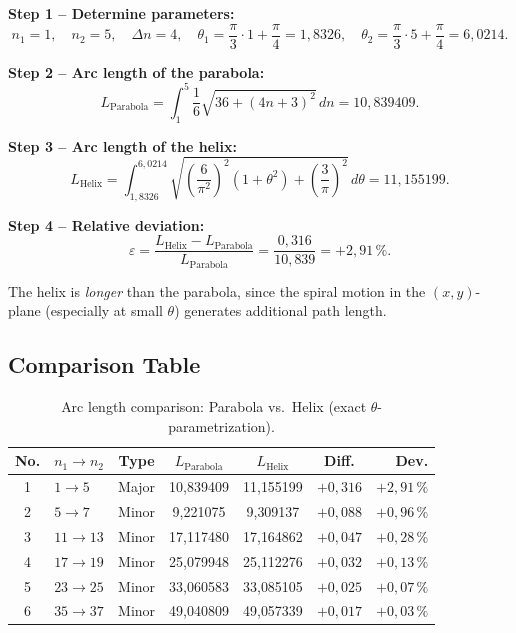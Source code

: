 \textbf{Step 1 -- Determine parameters:}
\[
n_1 = 1,\quad n_2 = 5,\quad \Delta n = 4,\quad
\theta_1 = \frac{\pi}{3}\cdot 1 + \frac{\pi}{4} = 1{,}8326,\quad
\theta_2 = \frac{\pi}{3}\cdot 5 + \frac{\pi}{4} = 6{,}0214.
\]

\textbf{Step 2 -- Arc length of the parabola:}
\[
L_{\text{Parabola}}
= \int_{1}^{5} \frac{1}{6}\sqrt{36 + (4n+3)^2}\, dn
= \boxed{10{,}839409}.
\]

\textbf{Step 3 -- Arc length of the helix:}
\[
L_{\text{Helix}}
= \int_{1{,}8326}^{6{,}0214}
  \sqrt{\left(\frac{6}{\pi^2}\right)^2(1 + \theta^2)
  + \left(\frac{3}{\pi}\right)^2}\, d\theta
= \boxed{11{,}155199}.
\]

\textbf{Step 4 -- Relative deviation:}
\[
\varepsilon = \frac{L_{\text{Helix}} - L_{\text{Parabola}}}{L_{\text{Parabola}}}
= \frac{0{,}316}{10{,}839} = \boxed{+2{,}91\,\%}.
\]

\begin{remark}
The helix is \emph{longer} than the parabola, since the
spiral motion in the $(x,y)$-plane (especially at small
$\theta$) generates additional path length.
\end{remark}

\subsection{Comparison Table}

\begin{table}[H]
\centering
\caption{Arc length comparison: Parabola vs.\ Helix
  (exact $\theta$-parametrization).}
\label{tab:bogenlaengenvergleich}
\begin{tabular}{clccccr}
\toprule
No. & $n_1 \to n_2$ & Type
  & $L_{\text{Parabola}}$ & $L_{\text{Helix}}$
  & Diff. & Dev. \\
\midrule
1 & $1 \to 5$   & Major
  & 10{,}839409 & 11{,}155199 & $+0{,}316$ & $+2{,}91\,\%$ \\
2 & $5 \to 7$   & Minor
  & 9{,}221075  & 9{,}309137  & $+0{,}088$ & $+0{,}96\,\%$ \\
3 & $11 \to 13$ & Minor
  & 17{,}117480 & 17{,}164862 & $+0{,}047$ & $+0{,}28\,\%$ \\
4 & $17 \to 19$ & Minor
  & 25{,}079948 & 25{,}112276 & $+0{,}032$ & $+0{,}13\,\%$ \\
5 & $23 \to 25$ & Minor
  & 33{,}060583 & 33{,}085105 & $+0{,}025$ & $+0{,}07\,\%$ \\
6 & $35 \to 37$ & Minor
  & 49{,}040809 & 49{,}057339 & $+0{,}017$ & $+0{,}03\,\%$ \\
\bottomrule
\end{tabular}
\end{table}

